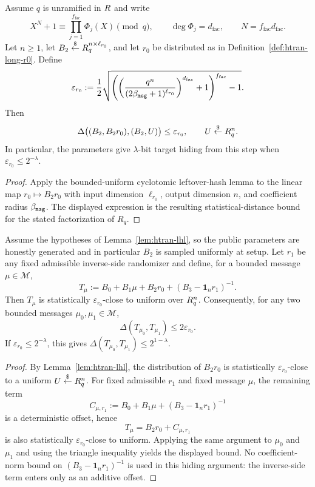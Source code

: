 \begin{lemma}\label{lem:htran-lhl}
Assume $q$ is unramified in $R$ and write
\[
  X^N+1 \equiv \prod_{j=1}^{f_{\mathrm{fac}}}\Phi_j(X) \pmod q,
  \qquad
  \deg \Phi_j=d_{\mathrm{fac}},
  \qquad
  N=f_{\mathrm{fac}}d_{\mathrm{fac}}.
\]
Let $n\ge 1$, let $B_2\overset{\$}{\leftarrow} R_q^{n\times \ell_{r_0}}$, and let $r_0$ be distributed as in
Definition~\ref{def:htran-long-r0}.  Define
\[
  \varepsilon_{r_0}
  :=
  \frac12
  \sqrt{
    \left(
      \left(
        \frac{q^n}{(2\beta_{\mathtt{msg}}+1)^{\ell_{r_0}}}
      \right)^{d_{\mathrm{fac}}}
      +1
    \right)^{f_{\mathrm{fac}}}
    -1
  }.
\]
Then
\[
  \Delta\bigl((B_2,B_2r_0),(B_2,U)\bigr)\le \varepsilon_{r_0},
  \qquad
  U\overset{\$}{\leftarrow} R_q^n.
\]
In particular, the parameters give $\lambda$-bit target hiding from this step when
$\varepsilon_{r_0}\le 2^{-\lambda}$.
\end{lemma}

\begin{proof}
Apply the bounded-uniform cyclotomic leftover-hash lemma to the linear map
$r_0\mapsto B_2r_0$ with input dimension $\ell_{r_0}$, output dimension $n$, and coefficient radius
$\beta_{\mathtt{msg}}$.  The displayed expression is the resulting statistical-distance bound for the stated
factorization of $R_q$.
\end{proof}

\begin{theorem}\label{thm:htran-target-hiding}
Assume the hypotheses of Lemma~\ref{lem:htran-lhl}, so the public parameters are honestly generated and
in particular $B_2$ is sampled uniformly at setup.  Let $r_1$ be any fixed admissible inverse-side randomizer
and define, for a bounded message $\mu\in\mathcal M$,
\[
  T_\mu := B_0+B_1\mu+B_2r_0+(B_3-\mathbf 1_n r_1)^{-1}.
\]
Then $T_\mu$ is statistically $\varepsilon_{r_0}$-close to uniform over $R_q^n$.  Consequently, for any two
bounded
messages $\mu_0,\mu_1\in\mathcal M$,
\[
  \Delta(T_{\mu_0},T_{\mu_1})\le 2\varepsilon_{r_0}.
\]
If $\varepsilon_{r_0}\le 2^{-\lambda}$, this gives
$\Delta(T_{\mu_0},T_{\mu_1})\le 2^{1-\lambda}$.
\end{theorem}

\begin{proof}
By Lemma~\ref{lem:htran-lhl}, the distribution of $B_2r_0$ is statistically $\varepsilon_{r_0}$-close to a
uniform
$U\overset{\$}{\leftarrow}R_q^n$.  For fixed admissible $r_1$ and fixed message $\mu$, the remaining term
\[
  C_{\mu,r_1}:=B_0+B_1\mu+(B_3-\mathbf 1_n r_1)^{-1}
\]
is a deterministic offset, hence
\[
  T_\mu=B_2r_0+C_{\mu,r_1}
\]
is also statistically $\varepsilon_{r_0}$-close to uniform.  Applying the same argument to $\mu_0$ and
$\mu_1$ and using the triangle inequality yields the displayed bound.  No coefficient-norm bound on
$(B_3-\mathbf 1_n r_1)^{-1}$ is used in this hiding argument: the inverse-side term enters only as an
additive offset.
\end{proof}

